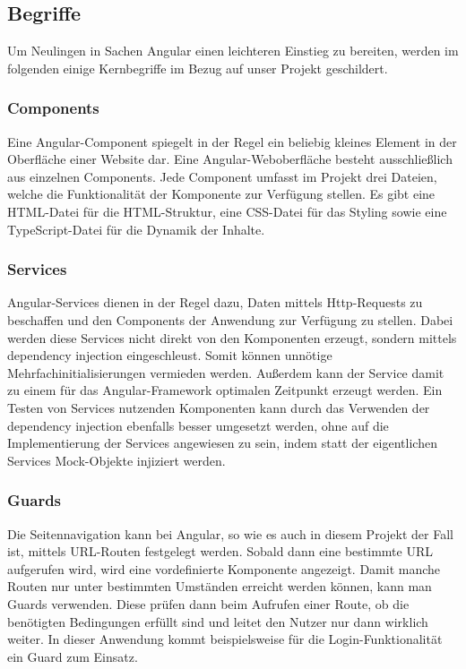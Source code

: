 \subsection{Begriffe}
Um Neulingen in Sachen Angular einen leichteren Einstieg zu bereiten, werden im folgenden einige Kernbegriffe im Bezug auf unser Projekt geschildert.

\subsubsection{Components}
Eine Angular-Component spiegelt in der Regel ein beliebig kleines Element in der Oberfläche einer Website dar. Eine Angular-Weboberfläche besteht ausschließlich aus einzelnen Components. Jede Component umfasst im Projekt drei Dateien, welche die Funktionalität der Komponente zur Verfügung stellen. Es gibt eine \acs{HTML}-Datei für die \acs{HTML}-Struktur, eine \acs{CSS}-Datei für das Styling sowie eine TypeScript-Datei für die Dynamik der Inhalte.

\subsubsection{Services}
Angular-Services dienen in der Regel dazu, Daten mittels Http-Requests zu beschaffen und den Components der Anwendung zur Verfügung zu stellen. Dabei werden diese Services nicht direkt von den Komponenten erzeugt, sondern mittels dependency injection eingeschleust. Somit können unnötige Mehrfachinitialisierungen vermieden werden. Außerdem kann der Service damit zu einem für das Angular-Framework optimalen Zeitpunkt erzeugt werden. Ein Testen von Services nutzenden Komponenten kann durch das Verwenden der dependency injection ebenfalls besser umgesetzt werden, ohne auf die Implementierung der Services angewiesen zu sein, indem statt der eigentlichen Services Mock-Objekte injiziert werden.

\subsubsection{Guards}
Die Seitennavigation kann bei Angular, so wie es auch in diesem Projekt der Fall ist, mittels \acs{URL}-Routen festgelegt werden. Sobald dann eine bestimmte \acs{URL} aufgerufen wird, wird eine vordefinierte Komponente angezeigt. Damit manche Routen nur unter bestimmten Umständen erreicht werden können, kann man Guards verwenden. Diese prüfen dann beim Aufrufen einer Route, ob die benötigten Bedingungen erfüllt sind und leitet den Nutzer nur dann wirklich weiter. In dieser Anwendung kommt beispielsweise für die Login-Funktionalität ein Guard zum Einsatz.

